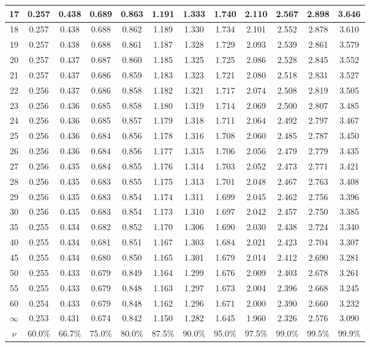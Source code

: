 \documentclass[12pt, a4paper]{article}
\begin{document}
\begin{table}[!htp]
\begin{center}
\begin{tabular}{|c|c|c|c|c|c|c|c|c|c|c|c|}
\hline
17&0.257&0.438&0.689&0.863&1.191&1.333&1.740&2.110&2.567&2.898&3.646 \\
\hline
18&0.257&0.438&0.688&0.862&1.189&1.330&1.734&2.101&2.552&2.878&3.610 \\
\hline
19&0.257&0.438&0.688&0.861&1.187&1.328&1.729&2.093&2.539&2.861&3.579 \\
\hline
20&0.257&0.437&0.687&0.860&1.185&1.325&1.725&2.086&2.528&2.845&3.552 \\
\hline
21&0.257&0.437&0.686&0.859&1.183&1.323&1.721&2.080&2.518&2.831&3.527 \\
\hline
22&0.256&0.437&0.686&0.858&1.182&1.321&1.717&2.074&2.508&2.819&3.505 \\
\hline
23&0.256&0.436&0.685&0.858&1.180&1.319&1.714&2.069&2.500&2.807&3.485 \\
\hline
24&0.256&0.436&0.685&0.857&1.179&1.318&1.711&2.064&2.492&2.797&3.467 \\
\hline
25&0.256&0.436&0.684&0.856&1.178&1.316&1.708&2.060&2.485&2.787&3.450 \\
\hline
26&0.256&0.436&0.684&0.856&1.177&1.315&1.706&2.056&2.479&2.779&3.435 \\
\hline
27&0.256&0.435&0.684&0.855&1.176&1.314&1.703&2.052&2.473&2.771&3.421 \\
\hline
28&0.256&0.435&0.683&0.855&1.175&1.313&1.701&2.048&2.467&2.763&3.408 \\
\hline
29&0.256&0.435&0.683&0.854&1.174&1.311&1.699&2.045&2.462&2.756&3.396 \\
\hline
30&0.256&0.435&0.683&0.854&1.173&1.310&1.697&2.042&2.457&2.750&3.385 \\
\hline
35&0.255&0.434&0.682&0.852&1.170&1.306&1.690&2.030&2.438&2.724&3.340 \\
\hline
40&0.255&0.434&0.681&0.851&1.167&1.303&1.684&2.021&2.423&2.704&3.307 \\
\hline
45&0.255&0.434&0.680&0.850&1.165&1.301&1.679&2.014&2.412&2.690&3.281 \\
\hline
50&0.255&0.433&0.679&0.849&1.164&1.299&1.676&2.009&2.403&2.678&3.261 \\
\hline
55&0.255&0.433&0.679&0.848&1.163&1.297&1.673&2.004&2.396&2.668&3.245 \\
\hline
60&0.254&0.433&0.679&0.848&1.162&1.296&1.671&2.000&2.390&2.660&3.232 \\
\hline
$\infty$
  &0.253&0.431&0.674&0.842&1.150&1.282&1.645&1.960&2.326&2.576&3.090 \\
\hline
\hline
$\nu$&60.0\%&66.7\%&75.0\%&80.0\%&87.5\%&90.0\%&95.0\%&97.5\%&99.0\%&99.5\%
     &99.9\% \\
     \hline
\end{tabular}
    \label{tab:t-table}
    \end{center}
\end{table}
\end{document}
